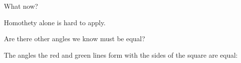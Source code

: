 What now?


Homothety alone is hard to apply.


Are there other angles we know must be equal?







The angles the red and green lines form with the sides of the square are equal:




